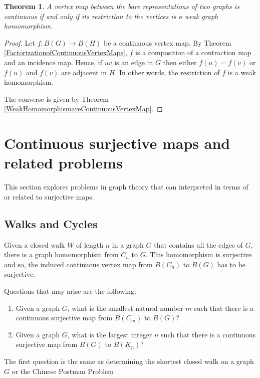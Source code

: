 \documentclass{amsart}
\newtheorem{theorem}{Theorem}[section]
\theoremstyle{definition}
\theoremstyle{remark}
\numberwithin{equation}{section}
\begin{document}
	\begin{theorem}
		\label{ContinuousVertexMapsareWeakHomomorphisms}
		A vertex map between the bare representations of two graphs is continuous if and only if its restriction
		to the vertices is a weak graph homomorphism.
	\end{theorem}
	\begin{proof}
		Let \(f:B(G) \rightarrow B(H)\) be a continuous vertex map. By Theorem \ref{FactorizationofContinuousVertexMaps}, \(f\) is a composition of a contraction map and an incidence map. Hence, if \(uv\) is an edge in \(G\) then either \(f(u)=f(v)\) or \(f(u)\) and \(f(v)\) are adjacent in \(H\). In other words, the restriction of \(f\) is a weak homomorphism.
		
		The converse is given by Theorem \ref{WeakHomomorphismareContinuousVertexMap}.
	\end{proof}
	
	\section{Continuous surjective maps and related problems}
	
	This section explores problems in graph theory that can interpreted in terms of or related to surjective maps.
	
	\subsection{Walks and Cycles}
	
	Given a closed walk \(W\) of length \(n\) in a graph \(G\) that contains all the edges of \(G\), there is a graph homomorphism from \(C_n\) to \(G\). This homomorphism is surjective and so, the induced continuous vertex map from \(B(C_n)\) to \(B(G)\) has to be surjective.
	
	Questions that may arise are the following:
	\begin{enumerate}
		\item Given a graph \(G\), what is the smallest natural number \(m\) such that there is a continuous surjective map from \(B(C_m)\) to \(B(G)\)?
		\item Given a graph \(G\), what is the largest integer \(n\) such that there is a continuous surjective map from \(B(G)\) to \(B(K_n)\)?
	\end{enumerate}
	The first question is the same as determining the shortest closed walk on a graph \(G\) or the Chinese Postman Problem \cite{edmonds1973matching,guan1962graphic}.
	
\end{document}

